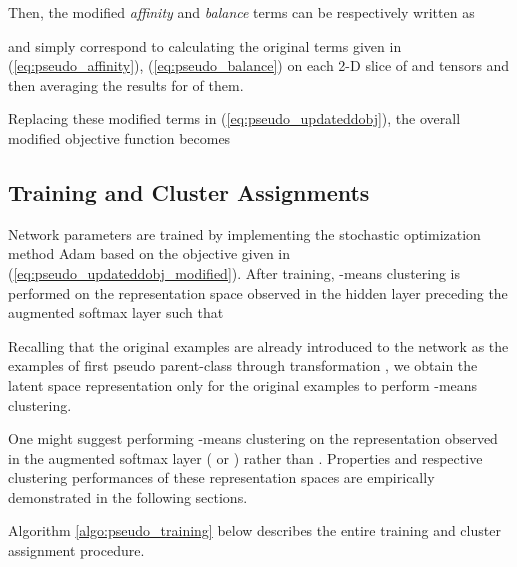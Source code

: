\documentclass{article} \usepackage{iclr2018_conference,times}
\begin{document}
Then, the modified \textit{affinity} and \textit{balance }terms can be respectively written as 

\begin{minipage}{0.5\linewidth}
	
\end{minipage}\begin{minipage}{0.5\linewidth}
	
\end{minipage}

and simply correspond to calculating the original terms given in (\ref{eq:pseudo_affinity}), (\ref{eq:pseudo_balance}) on each 2-D  slice of  and  tensors and then averaging the results for  of them.

Replacing these modified terms in (\ref{eq:pseudo_updateddobj}), the overall modified objective function becomes 


\subsection{Training and Cluster Assignments}
Network parameters are trained by implementing the stochastic optimization method Adam \citep{KingmaB14} based on the objective given in (\ref{eq:pseudo_updateddobj_modified}). After training, -means clustering is performed on the representation space observed in the hidden layer preceding the augmented softmax layer such that

Recalling that the original examples are already introduced to the network as the examples of first pseudo parent-class through transformation , we obtain the latent space representation only for the original examples to perform -means clustering. 

One might suggest performing -means clustering on the representation observed in the augmented softmax layer ( or ) rather than . Properties and respective clustering performances of these representation spaces are empirically demonstrated in the following sections.  


Algorithm \ref{algo:pseudo_training} below describes the entire training and cluster assignment procedure.  
\end{document}
